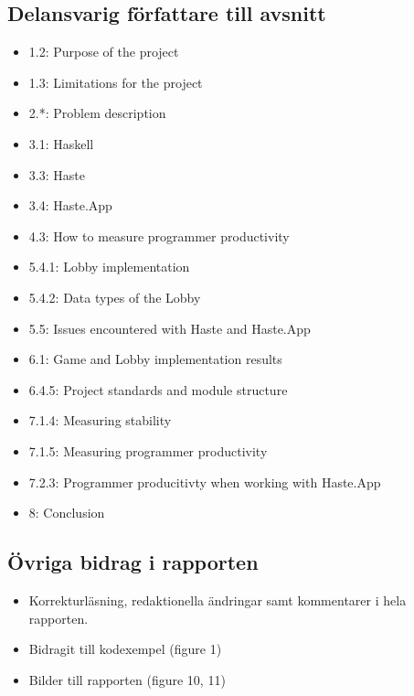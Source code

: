 \subsection{Delansvarig författare till avsnitt}
\begin{itemize}
    \item 1.2: Purpose of the project
    \item 1.3: Limitations for the project
    \item 2.*: Problem description
    \item 3.1: Haskell
    \item 3.3: Haste
    \item 3.4: Haste.App
    \item 4.3: How to measure programmer productivity
    \item 5.4.1: Lobby implementation
    \item 5.4.2: Data types of the Lobby
    \item 5.5: Issues encountered with Haste and Haste.App
    \item 6.1: Game and Lobby implementation results
    \item 6.4.5: Project standards and module structure
    \item 7.1.4: Measuring stability
    \item 7.1.5: Measuring programmer productivity
    \item 7.2.3: Programmer producitivty when working with Haste.App
    \item 8: Conclusion
\end{itemize}

\subsection{Övriga bidrag i rapporten}
\begin{itemize}
    \item Korrekturläsning, redaktionella ändringar samt kommentarer i hela rapporten.
    \item Bidragit till kodexempel (figure 1)
    \item Bilder till rapporten (figure 10, 11)

\end{itemize}